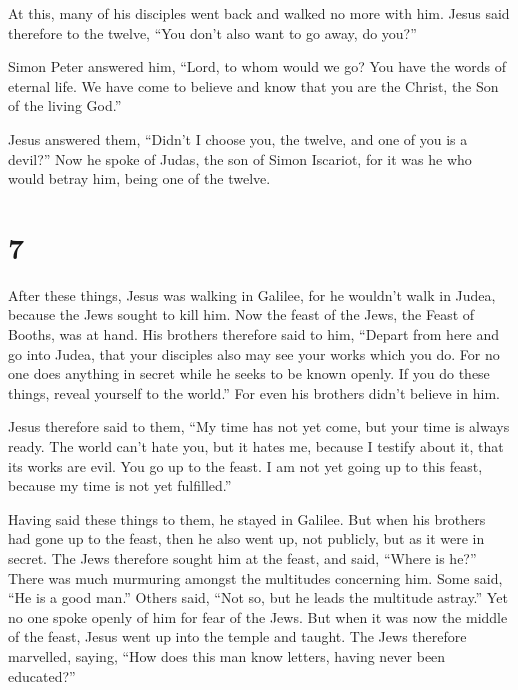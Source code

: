  At this, many of his disciples went back and walked no
more with him.  Jesus said therefore to the twelve, ``You
don't also want to go away, do you?''

 Simon Peter answered him, ``Lord, to whom would we go?
You have the words of eternal life.  We have come to
believe and know that you are the Christ, the Son of the living God.''

 Jesus answered them, ``Didn't I choose you, the twelve,
and one of you is a devil?''  Now he spoke of Judas, the
son of Simon Iscariot, for it was he who would betray him, being one of
the twelve.

\hypertarget{section-6}{%
\section{7}\label{section-6}}

 After these things, Jesus was walking in Galilee, for he
wouldn't walk in Judea, because the Jews sought to kill him.
 Now the feast of the Jews, the Feast of Booths, was at
hand.  His brothers therefore said to him, ``Depart from
here and go into Judea, that your disciples also may see your works
which you do.  For no one does anything in secret while he
seeks to be known openly. If you do these things, reveal yourself to the
world.''  For even his brothers didn't believe in him.

 Jesus therefore said to them, ``My time has not yet come,
but your time is always ready.  The world can't hate you,
but it hates me, because I testify about it, that its works are evil.
 You go up to the feast. I am not yet going up to this
feast, because my time is not yet fulfilled.''

 Having said these things to them, he stayed in Galilee.
 But when his brothers had gone up to the feast, then he
also went up, not publicly, but as it were in secret. 
The Jews therefore sought him at the feast, and said, ``Where is he?''
 There was much murmuring amongst the multitudes
concerning him. Some said, ``He is a good man.'' Others said, ``Not so,
but he leads the multitude astray.''  Yet no one spoke
openly of him for fear of the Jews.  But when it was now
the middle of the feast, Jesus went up into the temple and taught.
 The Jews therefore marvelled, saying, ``How does this
man know letters, having never been educated?''

